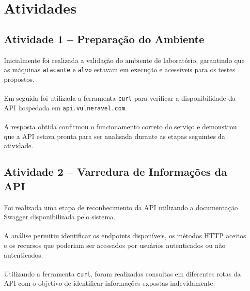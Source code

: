 \section{Atividades}

\subsection{Atividade 1 -- Preparação do Ambiente}

\paragraph{}
Inicialmente foi realizada a validação do ambiente de laboratório, garantindo
que as máquinas \texttt{atacante} e \texttt{alvo} estavam em execução e
acessíveis para os testes propostos.

\paragraph{}
Em seguida foi utilizada a ferramenta \texttt{curl} para verificar a
disponibilidade da API hospedada em \texttt{api.vulneravel.com}.

\paragraph{}
A resposta obtida confirmou o funcionamento correto do serviço e demonstrou que
a API estava pronta para ser analisada durante as etapas seguintes da atividade.

\subsection{Atividade 2 -- Varredura de Informações da API}

\paragraph{}
Foi realizada uma etapa de reconhecimento da API utilizando a documentação
Swagger disponibilizada pelo sistema.

\paragraph{}
A análise permitiu identificar os endpoints disponíveis, os métodos HTTP
aceitos e os recursos que poderiam ser acessados por usuários autenticados ou
não autenticados.

\paragraph{}
Utilizando a ferramenta \texttt{curl}, foram realizadas consultas em diferentes
rotas da API com o objetivo de identificar informações expostas
indevidamente.

